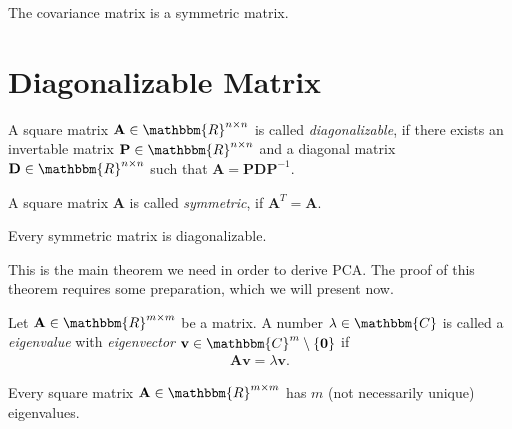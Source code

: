 The covariance matrix is a symmetric matrix.

\section{Diagonalizable Matrix}
\label{sec:diagonalizable_matrix}

\begin{definition}
	A square matrix $\mathbf{A} \in \mathbbm{R}^{n \times n}$ is called \textit{diagonalizable}, if there exists an invertable matrix $\mathbf{P} \in \mathbbm{R}^{n \times n}$ and a diagonal matrix $\mathbf{D} \in \mathbbm{R}^{n \times n}$ such that $\mathbf{A} = \mathbf{P}\mathbf{D}\mathbf{P}^{-1}$.
\end{definition}

\begin{definition}
	A square matrix $\mathbf{A}$ is called \textit{symmetric}, if $\mathbf{A}^T = \mathbf{A}$.
\end{definition}

\newpage
\begin{theorem}
	\label{th:symmetric_matrix_diagonalizable}
	Every symmetric matrix is diagonalizable.
\end{theorem}

This is the main theorem we need in order to derive PCA. The proof of this theorem requires some preparation, which we will \color{change} present \color{black} now.

\begin{definition}
	Let $\mathbf{A} \in \mathbbm{R}^{m\times m}$ be a matrix. A number $\lambda \in \mathbbm{C}$ is called a \textit{eigenvalue} with \textit{eigenvector} $\mathbf{v} \in \mathbbm{C}^m\setminus\{\mathbf{0}\}$ if
	\begin{align}
		\label{eq:def_eigenvalue}
		\mathbf{Av} = \lambda \mathbf{v}.
	\end{align}
\end{definition}

\begin{lemma}
	\label{lem:existence_eigenvalues}
	Every square matrix $\mathbf{A} \in \mathbbm{R}^{m\times m}$ has $m$ (not necessarily unique) eigenvalues.
\end{lemma}

